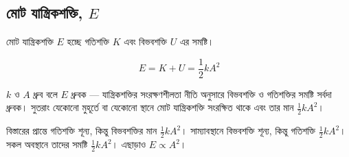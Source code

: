 \subsection{মোট যান্ত্রিকশক্তি, $E$}

মোট যান্ত্রিকশক্তি $E$ হচ্ছে গতিশক্তি $K$ এবং বিভবশক্তি $U$ এর সমষ্টি।

\begin{equation}
    E = K + U = \frac{1}{2}kA^2
\end{equation}

$k$ ও $A$ ধ্রুব বলে $E$ ধ্রুবক — যান্ত্রিকশক্তির সংরক্ষণশীলতা নীতি অনুসারে বিভবশক্তি ও গতিশক্তির সমষ্টি সর্বদা ধ্রুবক। সুতরাং যেকোনো মুহূর্তে বা যেকোনো স্থানে মোট যান্ত্রিকশক্তি সংরক্ষিত থাকে এবং তার মান $\frac{1}{2}kA^2$।

বিস্তারের প্রান্তে গতিশক্তি শূন্য, কিন্তু বিভবশক্তির মান $\frac{1}{2}kA^2$। সাম্যাবস্থানে বিভবশক্তি শূন্য, কিন্তু গতিশক্তি $\frac{1}{2}kA^2$। সকল অবস্থানে তাদের সমষ্টি $\frac{1}{2}kA^2$। এছাড়াও $E \propto A^2$।
